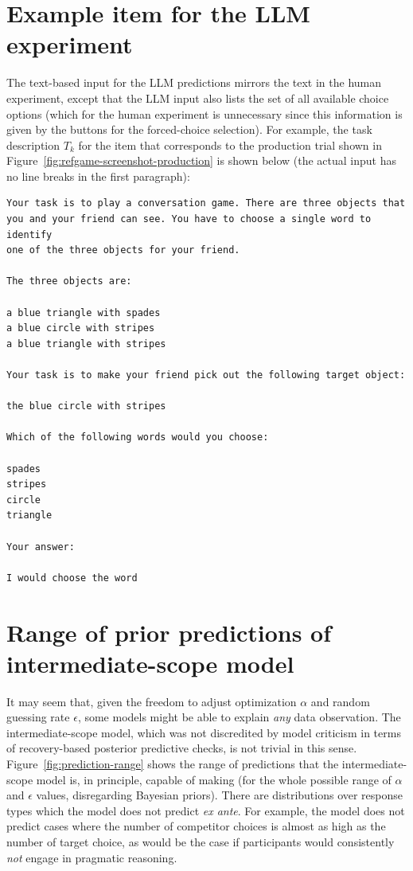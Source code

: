 \documentclass[fleqn]{article}
\begin{document}
\section{Example item for the LLM experiment}
\label{sec:examples-items-llm}

The text-based input for the LLM predictions mirrors the text in the human experiment, except that the LLM input also lists the set of all available choice options (which for the human experiment is unnecessary since this information is given by the buttons for the forced-choice selection).
For example, the task description $T_{k}$ for the item that corresponds to the production trial shown in Figure~\ref{fig:refgame-screenshot-production} is shown below (the actual input has no line breaks in the first paragraph):

\begin{verbatim}
Your task is to play a conversation game. There are three objects that
you and your friend can see. You have to choose a single word to identify
one of the three objects for your friend.

The three objects are:

a blue triangle with spades
a blue circle with stripes
a blue triangle with stripes

Your task is to make your friend pick out the following target object:

the blue circle with stripes

Which of the following words would you choose:

spades
stripes
circle
triangle

Your answer:

I would choose the word
\end{verbatim}


\section{Range of prior predictions of intermediate-scope model}
\label{sec:range-prior-pred}

It may seem that, given the freedom to adjust optimization $\alpha$ and random guessing rate $\epsilon$, some models might be able to explain \emph{any} data observation.
The intermediate-scope model, which was not discredited by model criticism in terms of recovery-based posterior predictive checks, is not trivial in this sense.
Figure~\ref{fig:prediction-range} shows the range of predictions that the intermediate-scope model is, in principle, capable of making (for the whole possible range of \(\alpha\) and \(\epsilon\) values, disregarding Bayesian priors).
There are distributions over response types which the model does not predict \emph{ex ante}.
For example, the model does not predict cases where the number of competitor choices is almost as high as the number of target choice, as would be the case if participants would consistently \emph{not} engage in pragmatic reasoning.
\end{document}
